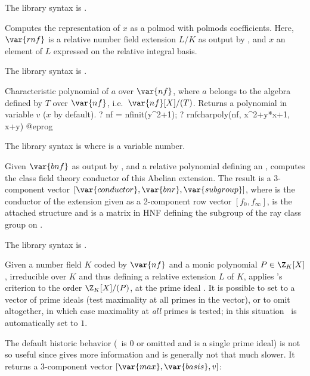 The library syntax is .

\label{se:rnfbasistoalg}
Computes the representation of $x$
as a polmod with polmods coefficients. Here, $\var{rnf}$ is a relative number
field extension $L/K$ as output by , and $x$ an element of
$L$ expressed on the relative integral basis.

The library syntax is .

\label{se:rnfcharpoly}
Characteristic polynomial of
$a$ over $\var{nf}$, where $a$ belongs to the algebra defined by $T$ over
$\var{nf}$, i.e.~$\var{nf}[X]/(T)$. Returns a polynomial in variable $v$
($x$ by default).
\bprog
? nf = nfinit(y^2+1);
? rnfcharpoly(nf, x^2+y*x+1, x+y)
@eprog

The library syntax is  where  is a variable number.

\label{se:rnfconductor}
Given $\var{bnf}$
as output by , and  a relative polynomial defining an
, computes the class field theory conductor of this
Abelian extension. The result is a 3-component vector
$[\var{conductor},\var{bnr},\var{subgroup}]$, where  is
the conductor of the extension given as a 2-component row vector
$[f_0,f_\infty]$,  is the attached  structure
and  is a matrix in HNF defining the subgroup of the ray class
group on .

The library syntax is .

\label{se:rnfdedekind}
Given a number field $K$ coded by $\var{nf}$ and a monic
polynomial $P\in \Z_K[X]$, irreducible over $K$ and thus defining a relative
extension $L$ of $K$, applies 's criterion to the order
$\Z_K[X]/(P)$, at the prime ideal . It is possible to set 
to a vector of prime ideals (test maximality at all primes in the vector),
or to omit altogether, in which case maximality at \emph{all} primes is tested;
in this situation \fl\ is automatically set to $1$.

The default historic behavior (\fl\ is 0 or omitted and  is a
single prime ideal) is not so useful since
 gives more information and is generally not that
much slower. It returns a 3-component vector $[\var{max}, \var{basis}, v]$:

